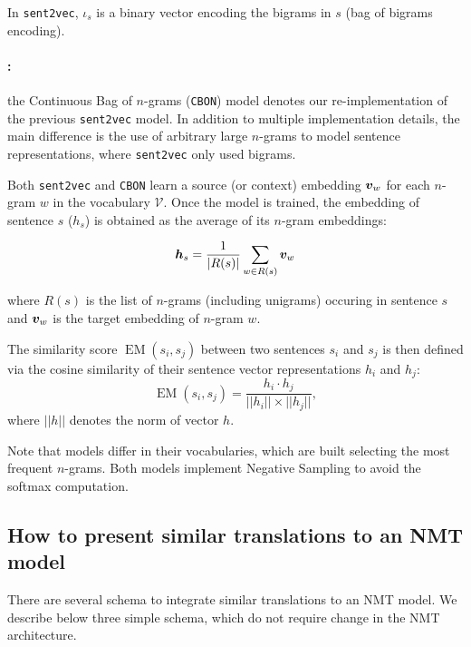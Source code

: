 In \texttt{sent2vec}, $\iota_{s}$ is a binary vector encoding the bigrams in $s$ (bag of bigrams encoding). 

\paragraph{:} the Continuous Bag of $n$-grams (\texttt{CBON}) 
 model denotes our re-implementation of the previous \texttt{sent2vec} model. In addition to multiple implementation details, the main difference is the use of arbitrary large $n$-grams to model sentence representations, where \texttt{sent2vec} only used bigrams.

\vspace{0.1cm}

Both \texttt{sent2vec} and \texttt{CBON} learn a source (or context) embedding $\boldsymbol{v}_w$ for each $n$-gram $w$ in the vocabulary $\mathcal{V}$.
Once the model is trained, the embedding of sentence $s$ ($h_s$) is obtained as the average of its $n$-gram embeddings:

\begin{equation*}
    \boldsymbol{h}_s = \frac{1}{|R(s)|} \sum_{w\in R(s)} \boldsymbol{v}_w
\end{equation*}

\noindent where $R(s)$ is the list of $n$-grams (including unigrams) occuring in sentence $s$ and $\boldsymbol{v}_w$ is the target embedding of $n$-gram $w$.

The similarity score $\operatorname{EM} (s_i,s_j)$ between two sentences $s_i$ and $s_j$ is then defined via the cosine similarity of their sentence vector representations $h_i$ and $h_j$:
\begin{equation*}
\operatorname{EM} (s_i, s_j) = \frac{h_i \cdot h_j}{||h_i|| \times ||h_j||},
\label{eq:EM-chap8}
\end{equation*}
\noindent where $||h||$ denotes the norm of vector $h$.

Note that models differ in their vocabularies, which are built selecting the most frequent $n$-grams.
Both models implement Negative Sampling to avoid the softmax computation. 

\subsection{How to present similar translations to an NMT model}
\label{ssec:schemes-chap8}
There are several schema to integrate similar translations to an NMT model. We describe below three simple schema, which do not require change in the NMT architecture.

